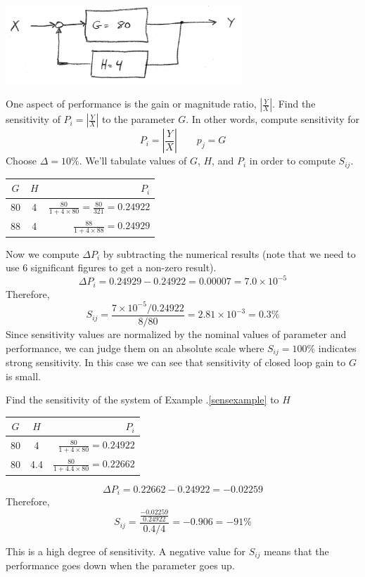 \begin{ExampleSmall}\label{sensexample}
\includegraphics[width=3.5in]{figs06/00772a.png}

One aspect of performance is the gain or magnitude ratio, $\left |\frac{Y}{X} \right|$.  Find the sensitivity of $P_i = \left |\frac{Y}{X} \right|$ to the parameter $G$.   In other words, compute sensitivity for
\[
P_i = \left |\frac{Y}{X} \right| \qquad p_j = G
\]
Choose $\Delta = 10\%$.  We'll tabulate values of $G$, $H$, and $P_i$ in order to compute $S_{ij}$.

\vspace{0.2in}
\begin{tabular}{ccr} \hline
 $G$   &  $H$   &  $P_i$       \\ \hline
  80   &   4    & $\frac{80}{1+4\times80} = \frac{80}{321} = 0.24922$     \\ \hline
  88   &   4    & $\frac{88}{1+4\times88} = 0.24929$                      \\ \hline
\end{tabular}

\vspace{0.2in}
Now we compute $\Delta P_i$ by subtracting the numerical results (note that we need to use 6 significant figures to get a non-zero result).
\[
\Delta P_i = 0.24929 - 0.24922 = 0.00007 = 7.0\times10^{-5}
\]
Therefore,
\[
S_{ij} = \frac{7\times10^{-5}/0.24922}{8/80} = 2.81\times10^{-3} = 0.3\%
\]
Since sensitivity values are normalized by the nominal values of parameter and performance, we can judge them on an absolute scale where $S_{ij} =100\%$ indicates strong sensitivity.   In this case we can see that sensitivity of closed loop gain to $G$ is small.

\end{ExampleSmall}


\begin{ExampleSmall}
Find the sensitivity of the system of Example \thechapter.\ref{sensexample} to $H$


\vspace{0.2in}
\begin{tabular}{ccr} \hline
 $G$   & $H$  &  $P_i$       \\ \hline
  80   & 4    &  $\frac{80}{1+4\times80} =   0.24922$     \\ \hline
  80   & 4.4  &  $\frac{80}{1+4.4\times80} = 0.22662$                      \\ \hline
\end{tabular}
\vspace{0.2in}

\[
\Delta P_i = 0.22662 - 0.24922 =  -0.02259
\]
Therefore,
\[
S_{ij} = \frac{\frac{-0.02259}{0.24922}}{0.4/4} = -0.906 = -91\%
\]

This is a high degree of sensitivity.  A negative value for $S_{ij}$ means that the performance goes down when the parameter goes up.
\end{ExampleSmall}

